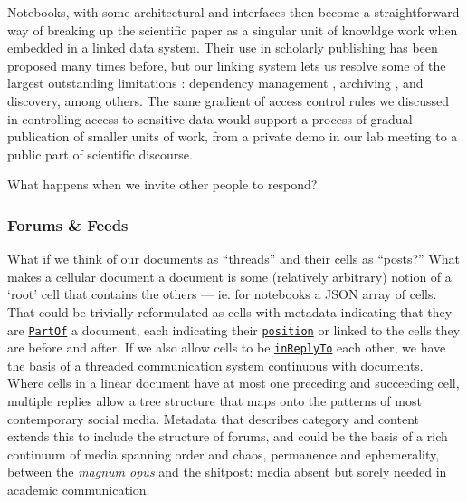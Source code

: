 Notebooks, with some architectural and interfaces then become a
straightforward way of breaking up the scientific paper as a singular
unit of knowldge work when embedded in a linked data system. Their use
in scholarly publishing has been proposed many times before, but our
linking system lets us resolve some of the largest outstanding
limitations \citep{chattopadhyayWhatWrongComputational2020} :
dependency management \citep{ruleTenSimpleRules2019} , archiving
\citep{woffordJupyterNotebooksDiscovery2020} , and discovery,
among others. The same gradient of access control rules we discussed in
controlling access to sensitive data would support a process of gradual
publication of smaller units of work, from a private demo in our lab
meeting to a public part of scientific discourse.

What happens when we invite other people to respond?

\hypertarget{forums-feeds}{%
\subsubsection{Forums \& Feeds}\label{forums-feeds}}

What if we think of our documents as ``threads'' and their cells as
``posts?'' What makes a cellular document a document is some (relatively
arbitrary) notion of a `root' cell that contains the others --- ie. for
notebooks a JSON array of cells. That could be trivially reformulated as
cells with metadata indicating that they are
\href{https://schema.org/isPartOf}{\texttt{PartOf}} a document, each
indicating their \href{https://schema.org/position}{\texttt{position}}
or linked to the cells they are before and after. If we also allow cells
to be
\href{https://www.w3.org/TR/activitystreams-vocabulary/\#dfn-inreplyto}{\texttt{inReplyTo}}
each other, we have the basis of a threaded communication system
continuous with documents. Where cells in a linear document have at most
one preceding and succeeding cell, multiple replies allow a tree
structure that maps onto the patterns of most contemporary social media.
Metadata that describes category and content extends this to include the
structure of forums, and could be the basis of a rich continuum of media
spanning order and chaos, permanence and ephemerality, between the
\emph{magnum opus} and the shitpost: media absent but sorely needed in
academic communication.

